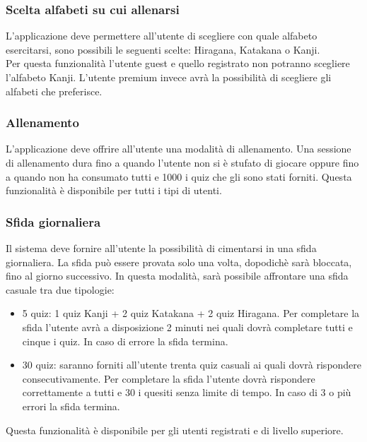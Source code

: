 \subsubsection{Scelta alfabeti su cui allenarsi} \label{req_scelta_alfabeto}
L'applicazione deve permettere all'utente di scegliere con quale alfabeto esercitarsi, sono possibili le seguenti scelte: Hiragana, Katakana o Kanji. \\
Per questa funzionalità l'utente guest e quello registrato non potranno scegliere l'alfabeto Kanji. L'utente premium invece avrà la possibilità di scegliere gli alfabeti che preferisce.

\subsubsection{Allenamento} \label{req_allenamento}
L'applicazione deve offrire all'utente una modalità di allenamento. Una sessione di allenamento dura fino a quando l'utente non si è stufato di giocare oppure fino a quando non ha consumato tutti e 1000 i quiz che gli sono stati forniti. Questa funzionalità è disponibile per tutti i tipi di utenti.

\subsubsection{Sfida giornaliera} \label{req_sfida_giornaliera}
Il sistema deve fornire all'utente la possibilità di cimentarsi in una sfida giornaliera. La sfida può essere provata solo una volta, dopodichè sarà bloccata, fino al giorno successivo. In questa modalità, sarà possibile affrontare una sfida casuale tra due tipologie:
\begin{itemize}
    \item 5 quiz: 1 quiz Kanji + 2 quiz Katakana + 2 quiz Hiragana. Per completare la sfida l'utente avrà a disposizione 2 minuti nei quali dovrà completare tutti e cinque i quiz.  In caso di errore la sfida termina.
    \item 30 quiz: saranno forniti all'utente trenta quiz casuali ai quali dovrà rispondere consecutivamente. Per completare la sfida l'utente dovrà rispondere correttamente a tutti e 30 i quesiti senza limite di tempo. In caso di 3 o più errori la sfida termina.
\end{itemize}
Questa funzionalità è disponibile per gli utenti registrati e di livello superiore.

